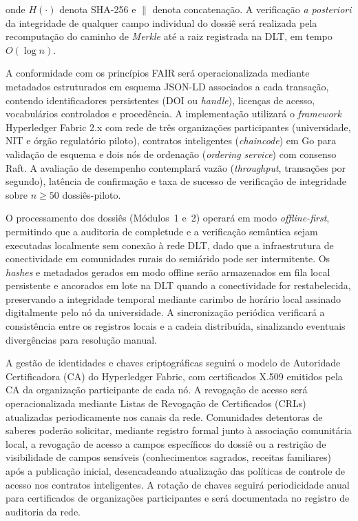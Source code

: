 \noindent onde $H(\cdot)$ denota SHA-256 e $\|$ denota concatenação. A verificação \textit{a posteriori} da integridade de qualquer campo individual do dossiê será realizada pela recomputação do caminho de \textit{Merkle} até a raiz registrada na DLT, em tempo $O(\log n)$.

A conformidade com os princípios FAIR \cite{Wilkinson2016} será operacionalizada mediante metadados estruturados em esquema JSON-LD associados a cada transação, contendo identificadores persistentes (DOI ou \textit{handle}), licenças de acesso, vocabulários controlados e procedência. A implementação utilizará o \textit{framework} Hyperledger Fabric 2.x \cite{Hyperledger2020} com rede de três organizações participantes (universidade, NIT e órgão regulatório piloto), contratos inteligentes (\textit{chaincode}) em Go para validação de esquema e dois nós de ordenação (\textit{ordering service}) com consenso Raft. A avaliação de desempenho contemplará vazão (\textit{throughput}, transações por segundo), latência de confirmação e taxa de sucesso de verificação de integridade sobre $n \geq 50$ dossiês-piloto.

O processamento dos dossiês (Módulos~1 e~2) operará em modo \textit{offline-first}, permitindo que a auditoria de completude e a verificação semântica sejam executadas localmente sem conexão à rede DLT, dado que a infraestrutura de conectividade em comunidades rurais do semiárido pode ser intermitente. Os \textit{hashes} e metadados gerados em modo offline serão armazenados em fila local persistente e ancorados em lote na DLT quando a conectividade for restabelecida, preservando a integridade temporal mediante carimbo de horário local assinado digitalmente pelo nó da universidade. A sincronização periódica verificará a consistência entre os registros locais e a cadeia distribuída, sinalizando eventuais divergências para resolução manual.

A gestão de identidades e chaves criptográficas seguirá o modelo de Autoridade Certificadora (CA) do Hyperledger Fabric, com certificados X.509 emitidos pela CA da organização participante de cada nó. A revogação de acesso será operacionalizada mediante Listas de Revogação de Certificados (CRLs) atualizadas periodicamente nos canais da rede. Comunidades detentoras de saberes poderão solicitar, mediante registro formal junto à associação comunitária local, a revogação de acesso a campos específicos do dossiê ou a restrição de visibilidade de campos sensíveis (conhecimentos sagrados, receitas familiares) após a publicação inicial, desencadeando atualização das políticas de controle de acesso nos contratos inteligentes. A rotação de chaves seguirá periodicidade anual para certificados de organizações participantes e será documentada no registro de auditoria da rede.

